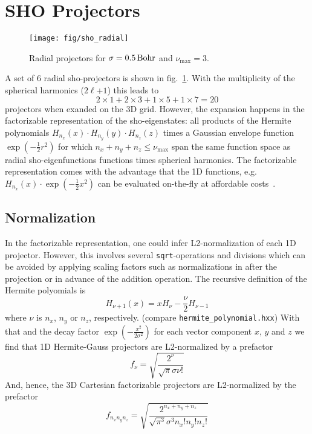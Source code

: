 \documentclass[oribibl]{llncs}
\newcommand{\um}[1]{_{\mathrm{#1}}}
\newcommand{\ttt}[1]{\texttt{#1}}
\begin{document}
\section{SHO Projectors}

%
\begin{figure}
  \begin{minipage}[c]{.990\textwidth}
	\texttt{[image: fig/sho\_radial]} %
  \end{minipage}\hfill
  \begin{minipage}[c]{.009\textwidth}
  \end{minipage}
  \label{fig:sho-radial-projectors}
  \caption{
  Radial projectors for $\sigma = \unit[0.5]{Bohr}$ and $\nu\um{max} = 3$.
  }
\end{figure}
%
%
A set of $6$ radial \ac{sho}-projectors is shown in fig.~\ref{fig:sho-radial-projectors}.
With the multiplicity of the spherical harmonics ($2\ell$+$1$) this leads to 
$$2 \times 1 + 2 \times 3 + 1 \times 5 + 1 \times 7 = 20$$
projectors when exanded on the 3D grid.
However, the expansion happens in the factorizable representation of the
\ac{sho}-eigenstates: all products of the Hermite polynomials 
$H_{n_x}(x) \cdot H_{n_y}(y) \cdot H_{n_z}(z)$ 
times a Gaussian envelope function $\exp(-\frac12 r^2)$
for which $n_x + n_y + n_z \leq \nu\um{max}$ span the same function space
as radial \ac{sho}-eigenfunctions functions times spherical harmonics.
The factorizable representation comes with the advantage that the 1D functions,
e.g.~$H_{n_x}(x) \cdot \exp(-\frac 12 x^2)$ can be evaluated on-the-fly 
at affordable costs~\cite{BaumeisterTsukamotoPASC19}.

\subsection{Normalization}
In the factorizable representation, one could infer L2-normalization of each 1D projector. 
However, this involves several \ttt{sqrt}-operations and divisions which can be avoided
by applying scaling factors such as normalizations in
after the projection or in advance of the addition operation.
The recursive definition of the Hermite polyomials is
\begin{equation}
	H_{\nu + 1}(x) = x H_{\nu} - \frac{\nu}{2} H_{\nu - 1}
\end{equation}
where $\nu$ is $n_x$, $n_y$ or $n_z$, respectively.
(compare \ttt{hermite\_polynomial.hxx}) 
With that and the decay factor $\exp\left({-\frac{x^2}{2\sigma^2}}\right)$
for each vector component $x$, $y$ and $z$
we find that 1D Hermite-Gauss projectors are L2-normalized by a prefactor
\begin{equation}
	f_{\nu} = \sqrt{ \frac{2^{\nu}} {\sqrt{\pi} \sigma \nu!} }
\end{equation}
And, hence, the 3D Cartesian factorizable projectors are L2-normalized by the prefactor
\begin{equation}
	f_{n_x n_y n_z} = \sqrt{ \frac{2^{n_x + n_y + n_z}} {\sqrt{\pi^3} \sigma^3 n_x! n_y! n_z!} }
\end{equation}
\end{document}
